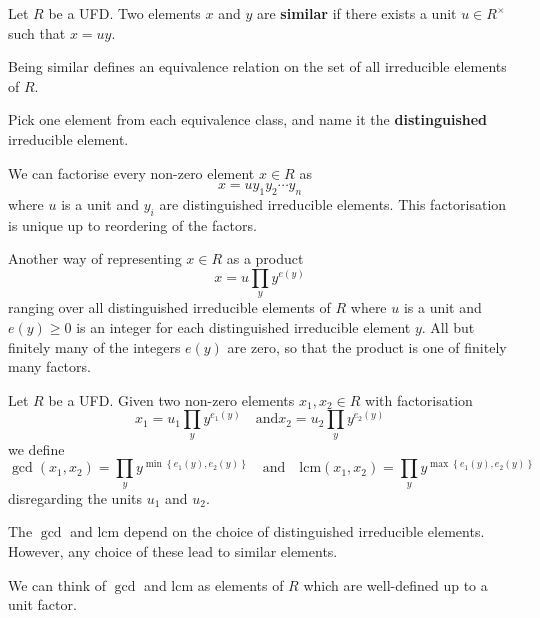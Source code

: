 \documentclass[12pt, a4paper]{article}
\begin{document}
\begin{definition}
    Let \(R\) be a UFD. Two elements \(x\) and \(y\) are \textbf{similar} if there exists a unit \(u \in R^{\times}\) such that \(x=uy\).
\end{definition}

\begin{proposition}
    Being similar defines an equivalence relation on the set of all irreducible elements of \(R\).
\end{proposition}

\begin{definition}
    Pick one element from each equivalence class, and name it the \textbf{distinguished} irreducible element.
\end{definition}

\begin{proposition}
    We can factorise every non-zero element \(x \in R\) as 
    \[x=u y_1 y_ 2\cdots y_n\]
    where \(u\) is a unit and \(y_i\) are distinguished irreducible elements. This factorisation is unique up to reordering of the factors.
\end{proposition}

\begin{proposition}
    Another way of representing \(x\in R\) as a product 
    \[x=u\prod_y y^{e(y)}\]
    ranging over all distinguished irreducible elements of \(R\) where \(u\) is a unit and \(e(y)\geq 0\) is an integer for each distinguished irreducible element \(y\). All but finitely many of the integers \(e(y)\) are zero, so that the product is one of finitely many factors.
\end{proposition}

\begin{definition}
    Let \(R\) be a UFD. Given two non-zero elements \(x_1,x_2 \in R\) with factorisation 
    \[x_1 = u_1 \prod_y y^{e_1(y)} \quad \text{and} x_2 = u_2\prod_y y^{e_2(y)}\]
    we define 
    \[\gcd(x_1,x_2) = \prod_y y^{\min\left\{ e_1(y),e_2(y) \right\}} \quad \text{and} \quad \text{lcm}(x_1,x_2) = \prod_y y^{\max\left\{ e_1(y),e_2(y) \right\}}\]
    disregarding the units \(u_1\) and \(u_2\).
\end{definition}

\begin{proposition}
    The \(\gcd\) and lcm depend on the choice of distinguished irreducible elements. However, any choice of these lead to similar elements.
\end{proposition}

\begin{mdnote}
    We can think of \(\gcd\) and lcm as elements of \(R\) which are well-defined up to a unit factor.
\end{mdnote}
\end{document}
